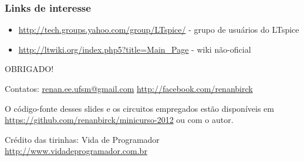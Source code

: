 \documentclass{beamer}
\begin{document}
\begin{frame}
\frametitle{Links de interesse}
\begin{itemize}
\item \url{http://tech.groups.yahoo.com/group/LTspice/} - grupo de usuários do LTspice
\item \url{http://ltwiki.org/index.php5?title=Main\_Page} - wiki não-oficial
\end{itemize}
\end{frame}

\begin{frame}
{\LARGE OBRIGADO!}
\end{frame}

\begin{frame}
Contatos: \url{renan.ee.ufsm@gmail.com} \url{http://facebook.com/renanbirck} \newline

O código-fonte desses slides e os circuitos empregados estão disponíveis em \url{https://github.com/renanbirck/minicurso-2012} ou com o autor.

Crédito das tirinhas: Vida de Programador \url{http://www.vidadeprogramador.com.br}
\end{frame}
\end{document}
